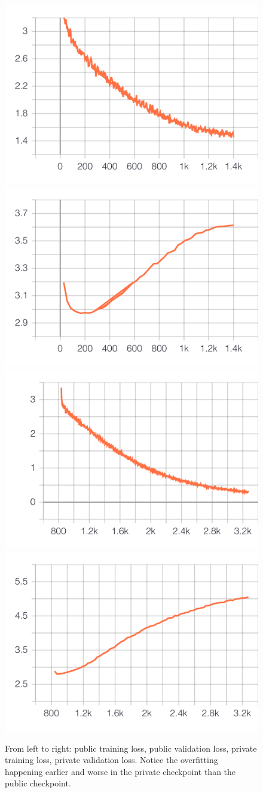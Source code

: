 \documentclass{article}
\begin{document}
\begin{figure}[tb]
\vspace{2mm}
 \centering
\includegraphics[width=0.24\columnwidth]{train_loss_public}
\includegraphics[width=0.24\columnwidth]{eval_loss_public}
\includegraphics[width=0.24\columnwidth]{train_loss_checkpoint}
\includegraphics[width=0.24\columnwidth]{eval_loss_checkpoint}
\vspace{-1mm}
\caption{From left to right: public training loss, public validation loss, private training loss, private validation loss. Notice the overfitting happening earlier and worse in the private checkpoint than the public checkpoint.}
\label{Fig:classifier_loss}
\vspace{-3mm}
\end{figure}

\begin{table}[t]
    \vspace{1em}
    \centering
    \vspace{1em}
        \caption{The maximum value for each metric is bolded. Best-Val is a checkpoint taken at the lowest validation loss for the classifier while Final is the one attained at the end of training. A positivee is defined as "Fake"}
    \label{Tab:classifier_metrics}
\end{table}
\end{document}
